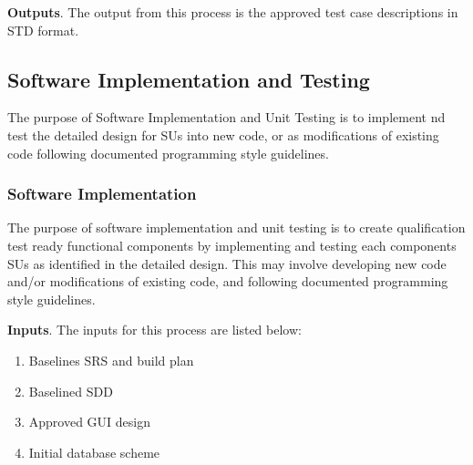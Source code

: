 \documentclass[a4paper, 11pt]{article}
\begin{document}
\textbf{Outputs}. The output from this process is the approved test case descriptions in STD format.

\subsection{Software Implementation and Testing}
The purpose of Software Implementation and Unit Testing is to implement nd test the detailed design for SUs into new code, or as modifications of existing code following documented programming style guidelines.
\subsubsection{Software Implementation}
The purpose of software implementation and unit testing is to create
qualification test ready functional components by implementing and testing each components SUs as identified in the detailed design. This may involve developing new code and/or modifications of existing code, and following documented programming style guidelines.

\textbf{Inputs}. The inputs for this process are listed below:
\begin{enumerate}
	\item Baselines SRS and build plan
	\item Baselined SDD
	\item Approved GUI design
	\item Initial database scheme
\end{enumerate}
\end{document}
